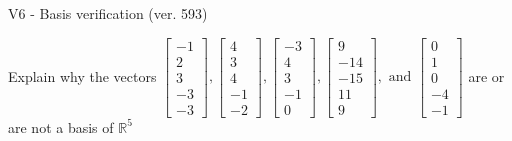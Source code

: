 \begin{exercise}
  \begin{exerciseTitle}V6 - Basis verification (ver. 593)\end{exerciseTitle}
  \begin{exerciseStatement}
    Explain why the vectors \(\left[\begin{array}{r}
-1 \\
2 \\
3 \\
-3 \\
-3
\end{array}\right] , \left[\begin{array}{r}
4 \\
3 \\
4 \\
-1 \\
-2
\end{array}\right] , \left[\begin{array}{r}
-3 \\
4 \\
3 \\
-1 \\
0
\end{array}\right] , \left[\begin{array}{r}
9 \\
-14 \\
-15 \\
11 \\
9
\end{array}\right] , \text{ and } \left[\begin{array}{r}
0 \\
1 \\
0 \\
-4 \\
-1
\end{array}\right]\) are or are not a basis of \(\mathbb{R}^5\)	



\end{exerciseStatement}
\end{exercise}
